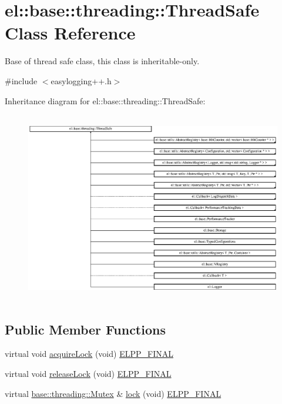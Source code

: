 \hypertarget{classel_1_1base_1_1threading_1_1_thread_safe}{}\section{el\+:\+:base\+:\+:threading\+:\+:Thread\+Safe Class Reference}
\label{classel_1_1base_1_1threading_1_1_thread_safe}


Base of thread safe class, this class is inheritable-\/only.  




{\ttfamily \#include $<$easylogging++.\+h$>$}

Inheritance diagram for el\+:\+:base\+:\+:threading\+:\+:Thread\+Safe\+:\begin{figure}[H]
\begin{center}
\leavevmode
\includegraphics[height=8.349900cm]{classel_1_1base_1_1threading_1_1_thread_safe}
\end{center}
\end{figure}
\subsection*{Public Member Functions}
\begin{DoxyCompactItemize}
\item 
virtual void \hyperlink{classel_1_1base_1_1threading_1_1_thread_safe_a59db719b214f7118f0919846a85077bf}{acquire\+Lock} (void) \hyperlink{easylogging_09_09_8h_a2f812449f8d3355cf5b03ceb2ee5021b}{E\+L\+P\+P\+\_\+\+F\+I\+N\+A\+L}
\item 
virtual void \hyperlink{classel_1_1base_1_1threading_1_1_thread_safe_a95bb166242b9691f861274a9b8ced2d9}{release\+Lock} (void) \hyperlink{easylogging_09_09_8h_a2f812449f8d3355cf5b03ceb2ee5021b}{E\+L\+P\+P\+\_\+\+F\+I\+N\+A\+L}
\item 
virtual \hyperlink{namespaceel_1_1base_1_1threading_ab9400eb234a82878e8458a65f9774320}{base\+::threading\+::\+Mutex} \& \hyperlink{classel_1_1base_1_1threading_1_1_thread_safe_affb45b35790a7305d0a659562c8104fc}{lock} (void) \hyperlink{easylogging_09_09_8h_a2f812449f8d3355cf5b03ceb2ee5021b}{E\+L\+P\+P\+\_\+\+F\+I\+N\+A\+L}
\end{DoxyCompactItemize}

